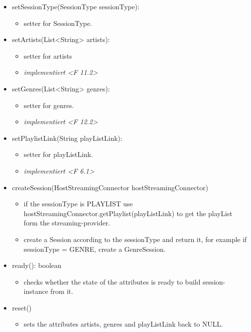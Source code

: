 \documentclass[oneside, ngerman]{sdqtechreport}
\begin{document}
\begin{itemize}
    \item setSessionType(SessionType sessionType):
    \begin{itemize}
        \item setter for SessionType.
    \end{itemize}
    \item setArtists(List<String> artists):
    \begin{itemize}
        \item setter for artists
        \item \textit{implementiert <F 11.2>}
    \end{itemize}
     \item setGenres(List<String> genres):
    \begin{itemize}
        \item setter for genres.
        \item \textit{implementiert <F 12.2>}
    \end{itemize}
     \item setPlaylistLink(String playListLink):
    \begin{itemize}
        \item setter for playListLink.
        \item \textit{implementiert <F 6.1>}
    \end{itemize}
    \item createSession(HostStreamingConnector hostStreamingConnector)
    \begin{itemize}
        \item if the sessionType is PLAYLIST use hostStreamingConnector.getPlaylist(playListLink) to get the playList form the streaming-provider.
        \item create a Session according to the sessionType and return it, for example if sessionType = GENRE, create a GenreSession. 
    \end{itemize}
    \item ready(): boolean
    \begin{itemize}
        \item checks whether the state of the attributes is ready to build  session-instance from it. 
    \end{itemize}
    \item reset()
    \begin{itemize}
        \item sets the attributes artists, genres and playListLink back to NULL.
    \end{itemize}
\end{itemize}
\end{document}
